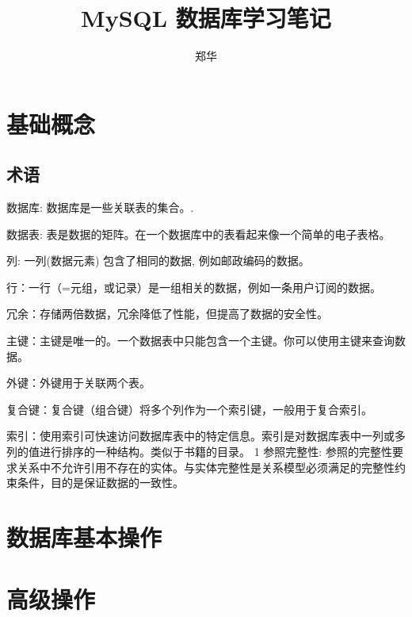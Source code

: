 \documentclass[UTF8,a4paper,12pt]{ctexbook}
\author{\kaishu 郑华}
\title{\heiti MySQL 数据库学习笔记}
\begin{document}
 	\maketitle
 \chapter{基础概念}
	 \section{术语}
		 数据库: 数据库是一些关联表的集合。.
		 
		 数据表: 表是数据的矩阵。在一个数据库中的表看起来像一个简单的电子表格。
		 
		 列: 一列(数据元素) 包含了相同的数据, 例如邮政编码的数据。
		 
		 行：一行（=元组，或记录）是一组相关的数据，例如一条用户订阅的数据。
		 
		 冗余：存储两倍数据，冗余降低了性能，但提高了数据的安全性。
		 
		 主键：主键是唯一的。一个数据表中只能包含一个主键。你可以使用主键来查询数据。
		 
		 外键：外键用于关联两个表。
		 
		 复合键：复合键（组合键）将多个列作为一个索引键，一般用于复合索引。
		 
		 索引：使用索引可快速访问数据库表中的特定信息。索引是对数据库表中一列或多列的值进行排序的一种结构。类似于书籍的目录。
		 1
		 参照完整性: 参照的完整性要求关系中不允许引用不存在的实体。与实体完整性是关系模型必须满足的完整性约束条件，目的是保证数据的一致性。
	 
 
 \chapter{数据库基本操作}
 
 \chapter{高级操作} 
		    
\end{document}
